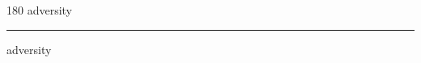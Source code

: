 
\begin{frame}
\begin{center}
\begin{turn}{180}
{\fontsize{2.5cm}{1em}\selectfont adversity}
\end{turn}
\vspace{1em}\par  
\hrule
\vspace{1em}\par  
{\fontsize{2.5cm}{1em}\selectfont adversity}
\end{center}
\end{frame}
